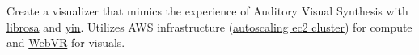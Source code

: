 {Create a visualizer that mimics the experience of Auditory Visual Synthesis with \href{https://librosa.org/}{librosa} and \href{http://audition.ens.fr/adc/pdf/2002_JASA_YIN.pdf}{yin}. Utilizes AWS infrastructure (\href{https://aws.amazon.com/ecs/}{autoscaling ec2 cluster}) for compute and \href{https://developer.mozilla.org/en-US/docs/Games/Techniques/3D_on_the_web/WebVR}{WebVR} for visuals.}
